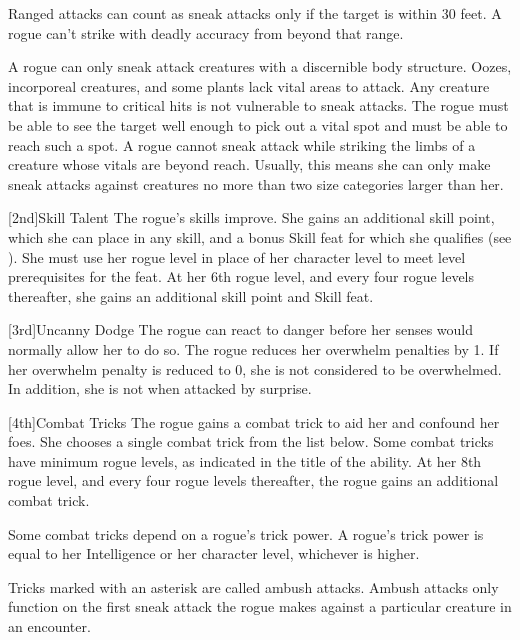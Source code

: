         Ranged attacks can count as sneak attacks only if the target is within 30 feet.
        A rogue can't strike with deadly accuracy from beyond that range.

        A rogue can only sneak attack creatures with a discernible body structure.
        Oozes, incorporeal creatures, and some plants lack vital areas to attack.
        Any creature that is immune to critical hits is not vulnerable to sneak attacks.
        The rogue must be able to see the target well enough to pick out a vital spot and must be able to reach such a spot.
        A rogue cannot sneak attack while striking the limbs of a creature whose vitals are beyond reach.
        Usually, this means she can only make sneak attacks against creatures no more than two size categories larger than her.

        [2nd]{Skill Talent}
        The rogue's skills improve.
        She gains an additional skill point, which she can place in any skill, and a bonus Skill feat for which she qualifies (see ).
        She must use her rogue level in place of her character level to meet level prerequisites for the feat.
        At her 6th rogue level, and every four rogue levels thereafter, she gains an additional skill point and Skill feat.

        [3rd]{Uncanny Dodge}
        The rogue can react to danger before her senses would normally allow her to do so.
        The rogue reduces her overwhelm penalties by 1.
        If her overwhelm penalty is reduced to 0, she is not considered to be overwhelmed.
        In addition, she is not \unaware when attacked by surprise.

        [4th]{Combat Tricks}
        The rogue gains a combat trick to aid her and confound her foes.
        She chooses a single combat trick from the list below.
        Some combat tricks have minimum rogue levels, as indicated in the title of the ability.
        At her 8th rogue level, and every four rogue levels thereafter, the rogue gains an additional combat trick.

        Some combat tricks depend on a rogue's trick power.
        A rogue's trick power is equal to her Intelligence or her character level, whichever is higher.

        Tricks marked with an asterisk are called ambush attacks.
        Ambush attacks only function on the first sneak attack the rogue makes against a particular creature in an encounter.

